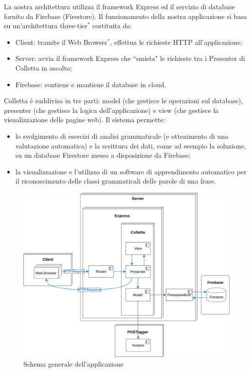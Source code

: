 La nostra architettura utilizza il framework Express ed il servizio di database fornito da Firebase (Firestore). Il funzionamento della nostra applicazione si basa su un'architettura three-tier$^{*}$ costituita da:
\begin{itemize}
	\item Client: tramite il Web Browser$^*$, effettua le richieste HTTP all'applicazione;
	\item Server: avvia il framework Express che ``smista" le richieste tra i Presenter di Colletta in ascolto;
	\item Firebase: contiene e mantiene il database in cloud.
\end{itemize}

Colletta è suddivisa in tre parti: model (che gestisce le operazioni sul database), presenter (che gestisce la logica dell'applicazione) e view (che gestisce la visualizzazione delle pagine web). Il sistema permette:
\begin{itemize}
	\item lo svolgimento di esercizi di analisi grammaticale (e ottenimento di una valutazione automatica) e la scrittura dei dati, come ad esempio la soluzione, su un database Firestore messo a disposizione da Firebase;
	\item la visualizzazione e l'utilizzo di un software di apprendimento automatico per il riconoscimento delle classi grammaticali delle parole di una frase.
\end{itemize}

\begin{figure}[h]
	\includegraphics[scale=0.4]{images/architettura.png}
	\caption{Schema generale dell'applicazione}
\end{figure}

